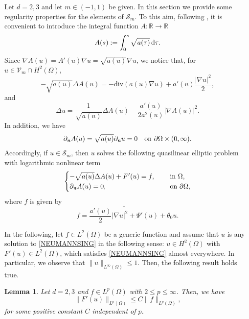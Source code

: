 \documentclass[11pt,reqno]{amsart}
\newtheorem{lemma}[theorem]{Lemma}
\theoremstyle{remark}
\def\n{\textbf{\textit{n}}}
\def\R{\mathbb{R}}
\def\d{{\rm d}}
\def\u{u}
\def\div{\mathrm{div}}
\numberwithin{equation}{section}
\def\d{{\rm d}}
\begin{document}
Let $d=2,3$ and let $m\in (-1,1)$ be given. In this section we provide some regularity properties for the elements of $\mathcal{S}_m$.
To this aim, following \cite{ADG2013}, it is convenient to introduce the integral function $A:\R\to\R$
\begin{equation}
\label{AAA}
A(s):= \int_0^s \sqrt{a(\tau)}\, \d \tau.
\end{equation}
Since $\nabla A(\u)= A'(\u)\nabla \u= \sqrt{a(\u)}\nabla \u$, we notice that, for $\u\in \mathcal{V}_m \cap H^2(\Omega)$,
\begin{equation}
\label{div-Aphi}
-\sqrt{a(\u)} \Delta A(\u)=- \div (a(\u)\nabla \u)+a'(\u) \frac{|\nabla \u|^2}{2},
\end{equation}
and
\begin{equation}
\label{phi-Aphi-rel}
\Delta u= \frac{1}{\sqrt{a(u)}} \Delta A(u) - \frac{a'(u)}{2 a^2(u)} | \nabla A(u)|^2.
\end{equation}
In addition, we have
$$
\partial_\n A(\u)= \sqrt{a(\u)} \partial_\n \u=0 \quad \text{on } \partial \Omega \times (0,\infty).
$$
Accordingly, if $\u\in \mathcal{S}_m$, then $\u$ solves the following quasilinear elliptic problem with logarithmic nonlinear term
\begin{equation}
\label{NEUMANNSING}
\begin{cases}
-\sqrt{a(\u)}\Delta A(\u)+F'(\u)=f,\quad &\text{ in }\Omega,\\
\partial_\n A(\u)=0, \quad &\text{ on }\partial \Omega,
\end{cases}
\end{equation}
where $f$ is given by
$$f=\overline{\frac{a'(\u)}{2} |\nabla \u|^2+\Psi'(\u)}+\theta_0 \u.$$

\medskip


In the following, let $f\in L^2(\Omega)$ be a generic function and assume that $\u$ is any solution to \eqref{NEUMANNSING} in the following sense: $\u\in H^2(\Omega)$ with $F'(\u)\in L^2(\Omega)$, which satisfies \eqref{NEUMANNSING} almost everywhere. In particular, we observe that $\| \u\|_{L^\infty(\Omega)}\leq 1$. Then, the following result holds true.

\begin{lemma}
\label{ell2}
Let $d=2,3$ and  $f\in L^p(\Omega)$ with $2\leq p \leq \infty$.
Then, we have
$$
\| F'(\u)\|_{L^p(\Omega)}\leq C\| f\|_{L^p(\Omega)},
$$
for some positive constant $C$ independent of $p$.
\end{lemma}
\end{document}
